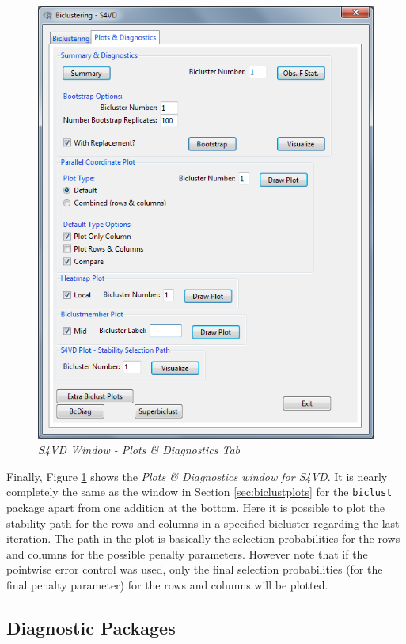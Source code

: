 \documentclass[a4paper]{article}\usepackage[]{graphicx}\usepackage[]{color}
\begin{document}
\begin{figure}[H]
\centering
\includegraphics[scale=0.5]{figures/s4vd_plotdiagtab.png}
\caption{{\it S4VD Window - Plots \& Diagnostics Tab}\label{s4vd_plotdiagtab}}
\end{figure}
\noindent Finally, Figure \ref{s4vd_plotdiagtab} shows the {\it Plots \&
Diagnostics window for S4VD}. It is nearly completely the same as the window in
Section \ref{sec:biclustplots} for the \texttt{biclust} package apart from one
addition at the bottom. Here it is possible to plot the stability path for the
rows and columns in a specified bicluster regarding the last iteration. The
path in the plot is basically the selection probabilities for the rows and
columns for the possible penalty parameters. However note that if the pointwise
error control was used, only the final selection probabilities (for the final
penalty parameter) for the rows and columns will be plotted.


\subsection{Diagnostic Packages}
\end{document}
